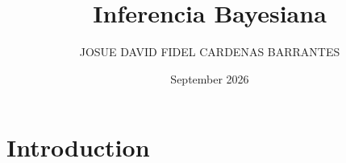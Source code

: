 \documentclass{article}
\title{Inferencia Bayesiana}
\author{JOSUE DAVID FIDEL CARDENAS BARRANTES}
\date{September 2026}
\begin{document}
\maketitle

\section{Introduction}
\end{document}
